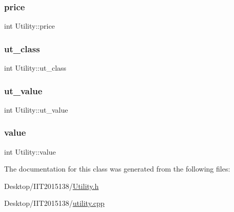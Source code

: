 \subsubsection{\texorpdfstring{price}{price}}
{\footnotesize\ttfamily int Utility\+::price\hspace{0.3cm}{\ttfamily [private]}}

\mbox{\label{classUtility_a99c826a24bddd5081149062d0015b177}} 
\subsubsection{\texorpdfstring{ut\+\_\+class}{ut\_class}}
{\footnotesize\ttfamily int Utility\+::ut\+\_\+class\hspace{0.3cm}{\ttfamily [private]}}

\mbox{\label{classUtility_a71b0a68187151843ff6ae4bdb92e98dd}} 
\subsubsection{\texorpdfstring{ut\+\_\+value}{ut\_value}}
{\footnotesize\ttfamily int Utility\+::ut\+\_\+value\hspace{0.3cm}{\ttfamily [private]}}

\mbox{\label{classUtility_aa9501be82bb8a484f4fccca328b742af}} 
\subsubsection{\texorpdfstring{value}{value}}
{\footnotesize\ttfamily int Utility\+::value\hspace{0.3cm}{\ttfamily [private]}}



The documentation for this class was generated from the following files\+:\begin{DoxyCompactItemize}
\item 
Desktop/\+I\+I\+T2015138/\hyperlink{Utility_8h}{Utility.\+h}\item 
Desktop/\+I\+I\+T2015138/\hyperlink{utility_8cpp}{utility.\+cpp}\end{DoxyCompactItemize}
